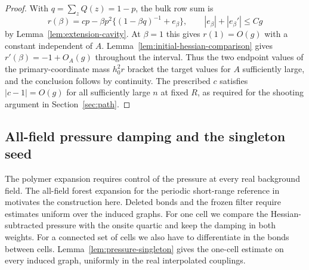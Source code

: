 \documentclass[11pt]{article}
\theoremstyle{definition}
\begin{document}
\begin{proof}
With \(q=\sum_z Q(z)=1-p\), the bulk row sum is
\begin{equation}
 r(\beta)=cp-\beta p^2\{(1-\beta q)^{-1}+e_\beta\},
 \qquad |e_\beta|+|e_\beta'|\le Cg
\end{equation}
by Lemma~\ref{lem:extension-cavity}. At \(\beta=1\) this gives
\(r(1)=O(g)\) with a constant independent of \(A\).
Lemma~\ref{lem:initial-hessian-comparison} gives \(r'(\beta)=-1+O_A(g)\)
throughout the interval. Thus the two endpoint values of the
primary-coordinate mass \(h_0^2r\) bracket the target values
for \(A\) sufficiently large, and the conclusion follows by
continuity. The prescribed \(c\) satisfies \(|c-1|=O(g)\) for
all sufficiently large \(n\) at fixed \(R\), as required for the
shooting argument in Section~\ref{sec:path}.
\end{proof}

\subsection{All-field pressure damping and the singleton seed}
\label{sec:pressure-singleton}

The polymer expansion requires control of the pressure at every
real background field. The all-field forest expansion for the periodic
short-range reference in \cite[Proposition~5.1]{IsingCorrelation}
motivates the construction here. Deleted bonds and the frozen filter
require estimates uniform over the induced graphs.
For one cell we compare the Hessian-subtracted pressure with the
onsite quartic and keep the damping in both weights. For a connected
set of cells we also have to differentiate in the bonds between cells.
Lemma~\ref{lem:pressure-singleton} gives the one-cell estimate on
every induced graph, uniformly in the real interpolated couplings.
\end{document}
